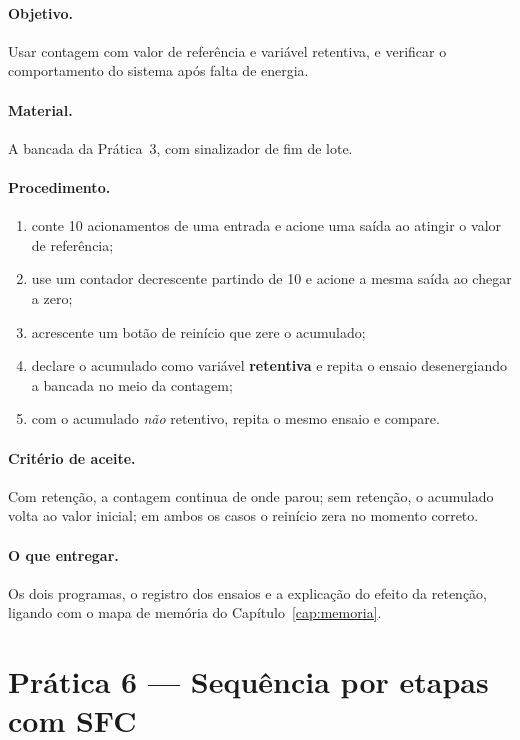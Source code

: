 \paragraph{Objetivo.} Usar contagem com valor de referência e variável retentiva, e verificar o
comportamento do sistema após falta de energia.

\paragraph{Material.} A bancada da Prática~3, com sinalizador de fim de lote.

\paragraph{Procedimento.}
\begin{enumerate}
  \item conte 10 acionamentos de uma entrada e acione uma saída ao atingir o valor de referência;
  \item use um contador decrescente partindo de 10 e acione a mesma saída ao chegar a zero;
  \item acrescente um botão de reinício que zere o acumulado;
  \item declare o acumulado como variável \textbf{retentiva} e repita o ensaio desenergiando a
        bancada no meio da contagem;
  \item com o acumulado \emph{não} retentivo, repita o mesmo ensaio e compare.
\end{enumerate}

\paragraph{Critério de aceite.} Com retenção, a contagem continua de onde parou; sem retenção, o
acumulado volta ao valor inicial; em ambos os casos o reinício zera no momento correto.

\paragraph{O que entregar.} Os dois programas, o registro dos ensaios e a explicação do efeito da
retenção, ligando com o mapa de memória do Capítulo~\ref{cap:memoria}.

\section{Prática 6 --- Sequência por etapas com SFC}

